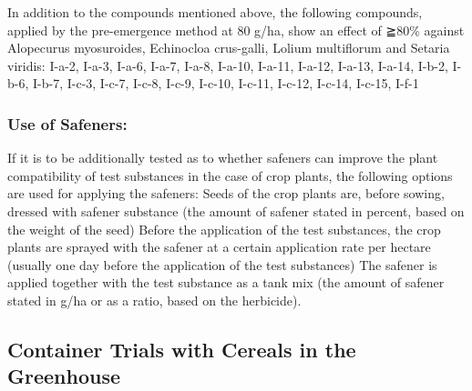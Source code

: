 \documentclass[11pt,a4paper]{article}
\begin{document}
In addition to the compounds mentioned above, the following compounds, applied by the pre-emergence method at 80 g/ha, show an effect of ≧80\% against Alopecurus myosuroides, Echinocloa crus-galli, Lolium multiflorum and Setaria viridis: I-a-2, I-a-3, I-a-6, I-a-7, I-a-8, I-a-10, I-a-11, I-a-12, I-a-13, I-a-14, I-b-2, I-b-6, I-b-7, I-c-3, I-c-7, I-c-8, I-c-9, I-c-10, I-c-11, I-c-12, I-c-14, I-c-15, I-f-1

\subsubsection{Use of Safeners:}

If it is to be additionally tested as to whether safeners can improve the plant compatibility of test substances in the case of crop plants, the following options are used for applying the safeners: Seeds of the crop plants are, before sowing, dressed with safener substance (the amount of safener stated in percent, based on the weight of the seed) Before the application of the test substances, the crop plants are sprayed with the safener at a certain application rate per hectare (usually one day before the application of the test substances) The safener is applied together with the test substance as a tank mix (the amount of safener stated in g/ha or as a ratio, based on the herbicide).

\subsection{Container Trials with Cereals in the Greenhouse}
\end{document}
